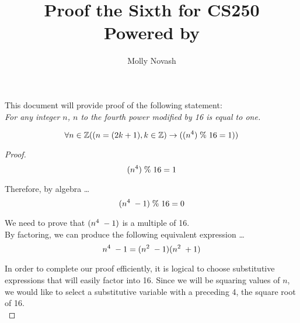 \documentclass[12pt]{article}
\author{Molly Novash}
\title{%
\Huge Proof the Sixth for CS250  \\
\normalsize Powered by \LaTeXe}
\begin{document}
\sloppy
\maketitle
\bigskip

This document will provide proof of the following statement: \\


\textit{For any integer $n$, $n$ to the fourth power modified by 16 is equal to one.}
\bigskip

\begin{equation}
\forall n \in \mathbb{Z}((n = (2k+1), k \in \mathbb{Z}) \rightarrow ((n^4) \hspace{.1cm} \% \hspace{.1cm} 16 = 1))
\end{equation}
\bigskip
\begin{proof}

\begin{equation}
(n^4) \hspace{.1cm} \% \hspace{.1cm} 16 = 1
\end{equation}
\bigskip

Therefore, by algebra \ldots \\
\begin{equation}
(n^4 \hspace{.1cm} - 1) \hspace{.1cm} \% \hspace{.1cm} 16 = 0
\end{equation}
\bigskip

We need to prove that $(n^4 \hspace{.1cm} - 1)$ is a multiple of 16. \\

By factoring, we can produce the following equivalent expression \ldots \\
\begin{equation}
n^4 \hspace{.1cm} - 1 = (n^2 \hspace{.1cm} - 1)(n^2 \hspace{.1cm} + 1)
\end{equation}
\bigskip

In order to complete our proof efficiently, it is logical to choose substitutive expressions that will easily factor into 16. Since we will be squaring values of $n$, we would like to select a substitutive variable with a preceding 4, the square root of 16. \\


\end{proof}
\end{document}
